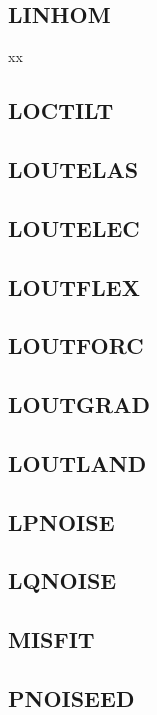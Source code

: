 \documentclass{article}
\begin{document}
\subsection{LINHOM   }
xx
\subsection{LOCTILT  }

\subsection{LOUTELAS }

\subsection{LOUTELEC }

\subsection{LOUTFLEX }

\subsection{LOUTFORC }

\subsection{LOUTGRAD }

\subsection{LOUTLAND }

\subsection{LPNOISE  }

\subsection{LQNOISE  }

\subsection{MISFIT   }

\subsection{PNOISEED }
\end{document}
